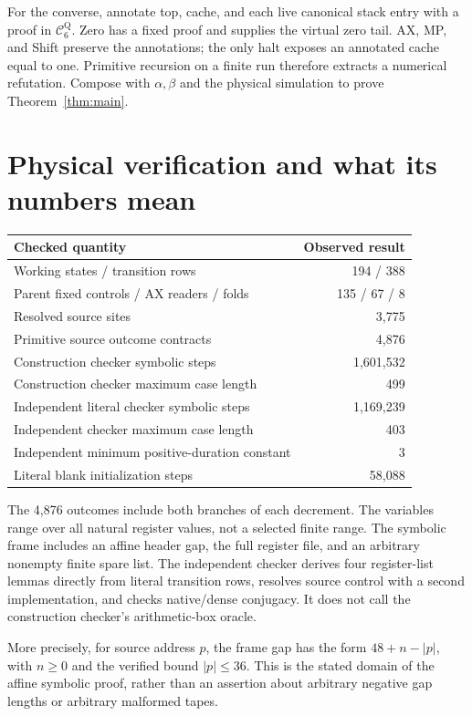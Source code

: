 \documentclass[11pt,letterpaper]{article}
\newcommand{\CQ}{\mathcal C^{\mathrm Q}_6}
\begin{document}
For the converse, annotate top, cache, and each live canonical stack entry
with a proof in \(\CQ\). Zero has a fixed proof and supplies the virtual
zero tail. AX, MP, and Shift preserve the annotations; the only halt exposes
an annotated cache equal to one. Primitive recursion on a finite run
therefore extracts a numerical refutation. Compose with \(\alpha,\beta\)
and the physical simulation to prove Theorem~\ref{thm:main}.

\section{Physical verification and what its numbers mean}\label{sec:verification}

\begin{center}
\begin{tabular}{@{}lr@{}}
\toprule Checked quantity & Observed result\\\midrule
Working states / transition rows & 194 / 388\\
Parent fixed controls / AX readers / folds & 135 / 67 / 8\\
Resolved source sites & 3,775\\
Primitive source outcome contracts & 4,876\\
Construction checker symbolic steps & 1,601,532\\
Construction checker maximum case length & 499\\
Independent literal checker symbolic steps & 1,169,239\\
Independent checker maximum case length & 403\\
Independent minimum positive-duration constant & 3\\
Literal blank initialization steps & 58,088\\
\bottomrule
\end{tabular}
\end{center}

The 4,876 outcomes include both branches of each decrement. The variables
range over all natural register values, not a selected finite range. The
symbolic frame includes an affine header gap, the full register file, and
an arbitrary nonempty finite spare list. The independent checker derives
four register-list lemmas directly from literal transition rows, resolves
source control with a second implementation, and checks native/dense
conjugacy. It does not call the construction checker's arithmetic-box
oracle.

More precisely, for source address \(p\), the frame gap has the form
\(48+n-|p|\), with \(n\ge0\) and the verified bound \(|p|\le36\).
This is the stated domain of the affine symbolic proof, rather than
an assertion about arbitrary negative gap lengths or arbitrary malformed
tapes.
\end{document}
